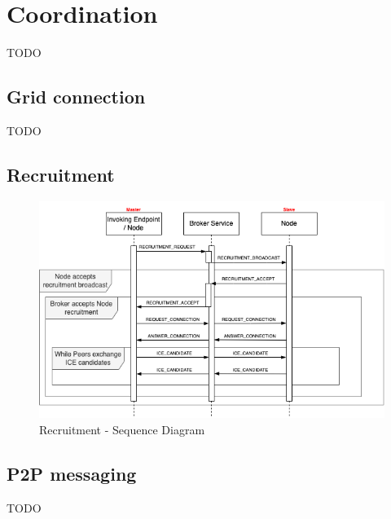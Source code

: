 \section{Coordination}\label{coordination}
TODO

\subsection{Grid connection}
TODO

\subsection{Recruitment}
\begin{figure}[!ht]
    \centering
    \includegraphics[width=\linewidth]{document/chapters/chapter_7/images/recruitment_messages.png}
    \caption{Recruitment - Sequence Diagram}
    \label{fig:recruitment_messages}
\end{figure}

\subsection{P2P messaging}
TODO